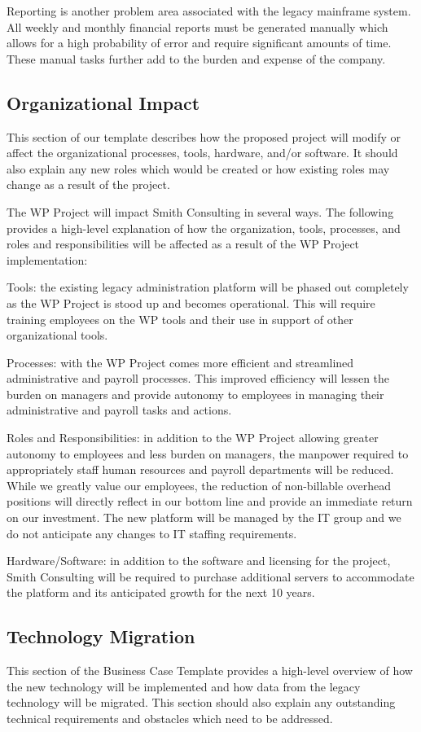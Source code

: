 \documentclass[11pt]{article}
\begin{document}
Reporting is another problem area associated with the legacy mainframe system. All weekly and monthly financial reports must be generated manually which allows for a high probability of error and require significant amounts of time. These manual tasks further add to the burden and expense of the company.

\subsection{Organizational Impact}
\label{sec:org5fe0c78}
This section of our template describes how the proposed project will modify or affect the organizational processes, tools, hardware, and/or software. It should also explain any new roles which would be created or how existing roles may change as a result of the project.

The WP Project will impact Smith Consulting in several ways. The following provides a high-level explanation of how the organization, tools, processes, and roles and responsibilities will be affected as a result of the WP Project implementation:

Tools: the existing legacy administration platform will be phased out completely as the WP Project is stood up and becomes operational. This will require training employees on the WP tools and their use in support of other organizational tools.

Processes: with the WP Project comes more efficient and streamlined administrative and payroll processes. This improved efficiency will lessen the burden on managers and provide autonomy to employees in managing their administrative and payroll tasks and actions.

Roles and Responsibilities: in addition to the WP Project allowing greater autonomy to employees and less burden on managers, the manpower required to appropriately staff human resources and payroll departments will be reduced. While we greatly value our employees, the reduction of non-billable overhead positions will directly reflect in our bottom line and provide an immediate return on our investment. The new platform will be managed by the IT group and we do not anticipate any changes to IT staffing requirements.

Hardware/Software: in addition to the software and licensing for the project, Smith Consulting will be required to purchase additional servers to accommodate the platform and its anticipated growth for the next 10 years.

\subsection{Technology Migration}
\label{sec:orgcf554d8}
This section of the Business Case Template provides a high-level overview of how the new technology will be implemented and how data from the legacy technology will be migrated. This section should also explain any outstanding technical requirements and obstacles which need to be addressed.
\end{document}
